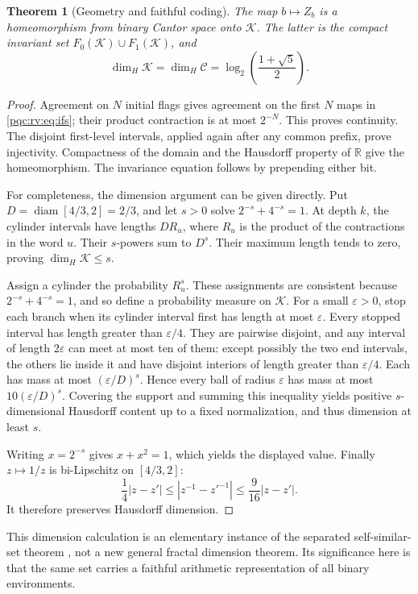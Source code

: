 \documentclass[11pt,letterpaper]{article}
\numberwithin{equation}{section}
\newtheorem{theorem}{Theorem}[section]
\theoremstyle{definition}
\theoremstyle{remark}
\newcommand{\R}{\mathbb R}
\newcommand{\eps}{\varepsilon}
\newcommand{\diam}{\operatorname{diam}}
\begin{document}
\begin{theorem}[Geometry and faithful coding]\label{pqc:rv:thm:cantor}
The map $b\mapsto Z_b$ is a homeomorphism from binary Cantor space
onto $\mathcal K$. The latter is the compact invariant set
$F_0(\mathcal K)\cup F_1(\mathcal K)$, and
\begin{equation}\label{pqc:rv:eq:dimension}
 \dim_H\mathcal K=\dim_H\mathcal C
 =\log_2\left(\frac{1+\sqrt5}{2}\right).
\end{equation}
\end{theorem}
\begin{proof}
Agreement on $N$ initial flags gives agreement on the first $N$ maps
in \cref{pqc:rv:eq:ifs}; their product contraction is at most $2^{-N}$.
This proves continuity. The disjoint first-level intervals, applied
again after any common prefix, prove injectivity. Compactness of the
domain and the Hausdorff property of $\R$ give the homeomorphism.
The invariance equation follows by prepending either bit.

For completeness, the dimension argument can be given directly. Put
$D=\diam[4/3,2]=2/3$, and let $s>0$ solve
$2^{-s}+4^{-s}=1$. At depth $k$, the cylinder intervals have lengths
$D R_u$, where $R_u$ is the product of the contractions in the word
$u$. Their $s$-powers sum to $D^s$. Their maximum length tends to
zero, proving $\dim_H\mathcal K\leq s$.

Assign a cylinder the probability $R_u^s$. These assignments are
consistent because $2^{-s}+4^{-s}=1$, and so define a probability
measure on $\mathcal K$. For a small $\eps>0$, stop each branch when
its cylinder interval first has length at most $\eps$. Every stopped
interval has length greater than $\eps/4$. They are pairwise
disjoint, and any interval of length $2\eps$ can meet at most ten
of them: except possibly the two end intervals, the others lie
inside it and have disjoint interiors of length greater than
$\eps/4$. Each has mass at most $(\eps/D)^s$. Hence every ball of
radius $\eps$ has mass at most $10(\eps/D)^s$. Covering the support
and summing this inequality yields positive $s$-dimensional Hausdorff
content up to a fixed normalization, and thus dimension at least $s$.

Writing $x=2^{-s}$ gives $x+x^2=1$, which yields the displayed
value. Finally $z\mapsto1/z$ is bi-Lipschitz on $[4/3,2]$:
\[
 \frac14|z-z'|\leq|z^{-1}-{z'}^{-1}|\leq\frac9{16}|z-z'|.
\]
It therefore preserves Hausdorff dimension.
\end{proof}

This dimension calculation is an elementary instance of the separated
self-similar-set theorem \cite{b62s17-hutchinson}, not a new general fractal
dimension theorem. Its significance here is that the same set carries
a faithful arithmetic representation of all binary environments.
\end{document}
